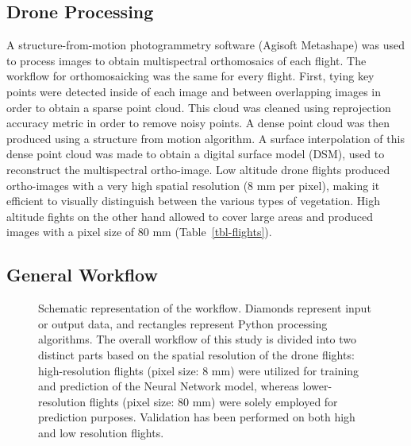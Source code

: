 \documentclass[
  number]{elsarticle}
\begin{document}
\subsection{Drone Processing}\label{drone-processing}

A structure-from-motion photogrammetry software (Agisoft Metashape) was
used to process images to obtain multispectral orthomosaics of each
flight. The workflow for orthomosaicking was the same for every flight.
First, tying key points were detected inside of each image and between
overlapping images in order to obtain a sparse point cloud. This cloud
was cleaned using reprojection accuracy metric in order to remove noisy
points. A dense point cloud was then produced using a structure from
motion algorithm. A surface interpolation of this dense point cloud was
made to obtain a digital surface model (DSM), used to reconstruct the
multispectral ortho-image. Low altitude drone flights produced
ortho-images with a very high spatial resolution (8 mm per pixel),
making it efficient to visually distinguish between the various types of
vegetation. High altitude fights on the other hand allowed to cover
large areas and produced images with a pixel size of 80 mm
(Table~\ref{tbl-flights}).

\subsection{General Workflow}\label{general-workflow}

\label{cell-fig-workflow}
\begin{figure}[H]


\caption{\label{fig-workflow}Schematic representation of the workflow.
Diamonds represent input or output data, and rectangles represent Python
processing algorithms. The overall workflow of this study is divided
into two distinct parts based on the spatial resolution of the drone
flights: high-resolution flights (pixel size: 8 mm) were utilized for
training and prediction of the Neural Network model, whereas
lower-resolution flights (pixel size: 80 mm) were solely employed for
prediction purposes. Validation has been performed on both high and low
resolution flights.}

\end{figure}%
\end{document}
